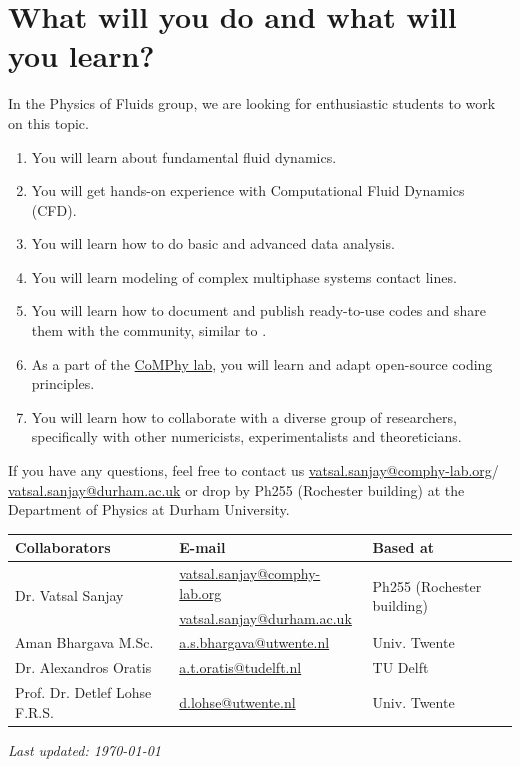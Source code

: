 \documentclass[11pt]{article}
\begin{document}
\section*{What will you do and what will you learn?}
In the Physics of Fluids group, we are looking for enthusiastic students to work on this topic.
\begin{enumerate}
\itemsep0em
\item You will learn about fundamental fluid dynamics.
\item You will get hands-on experience with Computational Fluid Dynamics (CFD).
\item You will learn how to do basic and advanced data analysis.
\item You will learn modeling of complex multiphase systems contact lines. 
\item You will learn how to document and publish ready-to-use codes and share them with the community, similar to \citet{basiliskVatsal, basiliskVatsalDropFilm, basiliskVatsalViscousBouncing}. 
\item As a part of the \href{https://comphy-lab.org}{CoMPhy lab}, you will learn and adapt open-source coding principles. 
\item You will learn how to collaborate with a diverse group of researchers, specifically with other numericists, experimentalists and theoreticians.
\end{enumerate}

If you have any questions, feel free to contact us \href{mailto:vatsal.sanjay@comphy-lab.org}{vatsal.sanjay@comphy-lab.org}/\\\href{mailto:vatsal.sanjay@durham.ac.uk}{vatsal.sanjay@durham.ac.uk} or drop by Ph255 (Rochester building) at the Department of Physics at Durham University.

\begin{center}
\begin{tabular}{|l|l|l|}
\hline \textbf{Collaborators} & \textbf{E-mail} & \textbf{Based at} \\
\hline \multirow{2}{*}{Dr. Vatsal Sanjay} & \href{mailto:vatsal.sanjay@comphy-lab.org}{vatsal.sanjay@comphy-lab.org} & \multirow{2}{*}{Ph255 (Rochester building)} \\
& \href{mailto:vatsal.sanjay@durham.ac.uk}{vatsal.sanjay@durham.ac.uk} & \\
\hline Aman Bhargava M.Sc. & \href{mailto:a.s.bhargava@utwente.nl}{a.s.bhargava@utwente.nl} & Univ. Twente \\
\hline Dr. Alexandros Oratis   & \href{mailto:a.t.oratis@tudelft.nl}{a.t.oratis@tudelft.nl}& TU Delft \\
\hline Prof. Dr. Detlef Lohse F.R.S. & \href{mailto:d.lohse@utwente.nl}{d.lohse@utwente.nl} & Univ. Twente  \\
\hline
\end{tabular}
\end{center}

\vspace{1em}
\noindent\textit{Last updated: \today}

\printbibliography
\end{document}
